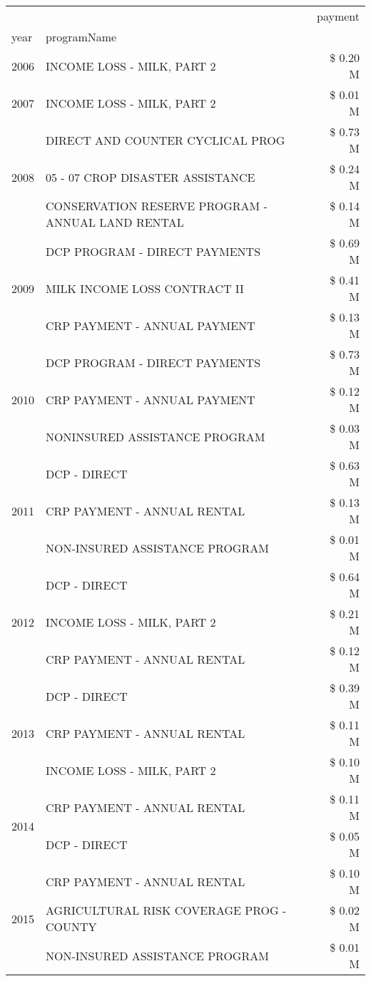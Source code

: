 \begin{tabular}{llr}
\toprule
 &  & payment \\
year & programName &  \\
\midrule
2006 & INCOME LOSS - MILK, PART 2 & \$ 0.20 M \\
\cline{1-3}
2007 & INCOME LOSS - MILK, PART 2 & \$ 0.01 M \\
\cline{1-3}
\multirow[t]{3}{*}{2008} & DIRECT AND COUNTER CYCLICAL PROG & \$ 0.73 M \\
 & 05 - 07 CROP DISASTER ASSISTANCE & \$ 0.24 M \\
 & CONSERVATION RESERVE PROGRAM - ANNUAL LAND RENTAL & \$ 0.14 M \\
\cline{1-3}
\multirow[t]{3}{*}{2009} & DCP PROGRAM - DIRECT PAYMENTS & \$ 0.69 M \\
 & MILK INCOME LOSS CONTRACT II & \$ 0.41 M \\
 & CRP PAYMENT - ANNUAL PAYMENT & \$ 0.13 M \\
\cline{1-3}
\multirow[t]{3}{*}{2010} & DCP PROGRAM - DIRECT PAYMENTS & \$ 0.73 M \\
 & CRP PAYMENT - ANNUAL PAYMENT & \$ 0.12 M \\
 & NONINSURED ASSISTANCE PROGRAM & \$ 0.03 M \\
\cline{1-3}
\multirow[t]{3}{*}{2011} & DCP - DIRECT & \$ 0.63 M \\
 & CRP PAYMENT - ANNUAL RENTAL & \$ 0.13 M \\
 & NON-INSURED ASSISTANCE PROGRAM & \$ 0.01 M \\
\cline{1-3}
\multirow[t]{3}{*}{2012} & DCP - DIRECT & \$ 0.64 M \\
 & INCOME LOSS - MILK, PART 2 & \$ 0.21 M \\
 & CRP PAYMENT - ANNUAL RENTAL & \$ 0.12 M \\
\cline{1-3}
\multirow[t]{3}{*}{2013} & DCP - DIRECT & \$ 0.39 M \\
 & CRP PAYMENT - ANNUAL RENTAL & \$ 0.11 M \\
 & INCOME LOSS - MILK, PART 2 & \$ 0.10 M \\
\cline{1-3}
\multirow[t]{2}{*}{2014} & CRP PAYMENT - ANNUAL RENTAL & \$ 0.11 M \\
 & DCP - DIRECT & \$ 0.05 M \\
\cline{1-3}
\multirow[t]{3}{*}{2015} & CRP PAYMENT - ANNUAL RENTAL & \$ 0.10 M \\
 & AGRICULTURAL RISK COVERAGE PROG - COUNTY & \$ 0.02 M \\
 & NON-INSURED ASSISTANCE PROGRAM & \$ 0.01 M \\

\end{tabular}
